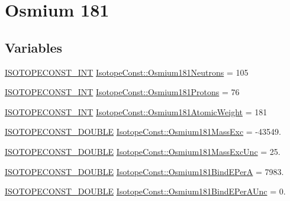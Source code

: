 \hypertarget{group___isotope_const-_osmium-_os181}{}\section{Osmium 181}
\label{group___isotope_const-_osmium-_os181}
\subsection*{Variables}
\begin{DoxyCompactItemize}
\item 
\mbox{\hyperlink{group___isotope_const-_macros_ga5f18360b3e99483a35c32d789e62621c}{I\+S\+O\+T\+O\+P\+E\+C\+O\+N\+S\+T\+\_\+\+I\+NT}} \mbox{\hyperlink{group___isotope_const-_osmium-_os181_ga19d6cdd5c422483723eb8c6aab62e3e2}{Isotope\+Const\+::\+Osmium181\+Neutrons}} = 105
\item 
\mbox{\hyperlink{group___isotope_const-_macros_ga5f18360b3e99483a35c32d789e62621c}{I\+S\+O\+T\+O\+P\+E\+C\+O\+N\+S\+T\+\_\+\+I\+NT}} \mbox{\hyperlink{group___isotope_const-_osmium-_os181_ga124a7597112c5a2fb52936c0418d3efd}{Isotope\+Const\+::\+Osmium181\+Protons}} = 76
\item 
\mbox{\hyperlink{group___isotope_const-_macros_ga5f18360b3e99483a35c32d789e62621c}{I\+S\+O\+T\+O\+P\+E\+C\+O\+N\+S\+T\+\_\+\+I\+NT}} \mbox{\hyperlink{group___isotope_const-_osmium-_os181_ga6b059ac36a611ea24eb842796ff33ced}{Isotope\+Const\+::\+Osmium181\+Atomic\+Weight}} = 181
\item 
\mbox{\hyperlink{group___isotope_const-_macros_ga8f45a7272ce02c0b4c65c44636ed719a}{I\+S\+O\+T\+O\+P\+E\+C\+O\+N\+S\+T\+\_\+\+D\+O\+U\+B\+LE}} \mbox{\hyperlink{group___isotope_const-_osmium-_os181_ga8f523f9841acae70acc2a4ecb8f77329}{Isotope\+Const\+::\+Osmium181\+Mass\+Exc}} = -\/43549.
\item 
\mbox{\hyperlink{group___isotope_const-_macros_ga8f45a7272ce02c0b4c65c44636ed719a}{I\+S\+O\+T\+O\+P\+E\+C\+O\+N\+S\+T\+\_\+\+D\+O\+U\+B\+LE}} \mbox{\hyperlink{group___isotope_const-_osmium-_os181_gaacdc9a4d28dbe881d82ef3d01c14ed80}{Isotope\+Const\+::\+Osmium181\+Mass\+Exc\+Unc}} = 25.
\item 
\mbox{\hyperlink{group___isotope_const-_macros_ga8f45a7272ce02c0b4c65c44636ed719a}{I\+S\+O\+T\+O\+P\+E\+C\+O\+N\+S\+T\+\_\+\+D\+O\+U\+B\+LE}} \mbox{\hyperlink{group___isotope_const-_osmium-_os181_ga793df5a3bc6a312de0d7c64b89274571}{Isotope\+Const\+::\+Osmium181\+Bind\+E\+PerA}} = 7983.
\item 
\mbox{\hyperlink{group___isotope_const-_macros_ga8f45a7272ce02c0b4c65c44636ed719a}{I\+S\+O\+T\+O\+P\+E\+C\+O\+N\+S\+T\+\_\+\+D\+O\+U\+B\+LE}} \mbox{\hyperlink{group___isotope_const-_osmium-_os181_ga10da7e17c718e98996246ee3c49ec5e4}{Isotope\+Const\+::\+Osmium181\+Bind\+E\+Per\+A\+Unc}} = 0.

\end{DoxyCompactItemize}
